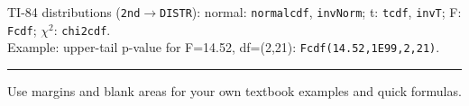 \documentclass[9pt,letterpaper]{article}
\begin{document}
\begin{calcbox}
TI-84 distributions (\texttt{2nd$\to$DISTR}): normal: \texttt{normalcdf}, \texttt{invNorm}; t: \texttt{tcdf}, \texttt{invT}; F: \texttt{Fcdf}; $\chi^2$: \texttt{chi2cdf}.\\
Example: upper-tail p-value for F=14.52, df=(2,21): \texttt{Fcdf(14.52,1E99,2,21)}.
\end{calcbox}

\vspace{2pt}\hrule\vspace{2pt}
\begin{center}\small
Use margins and blank areas for your own textbook examples and quick formulas.
\end{center}
\end{document}
